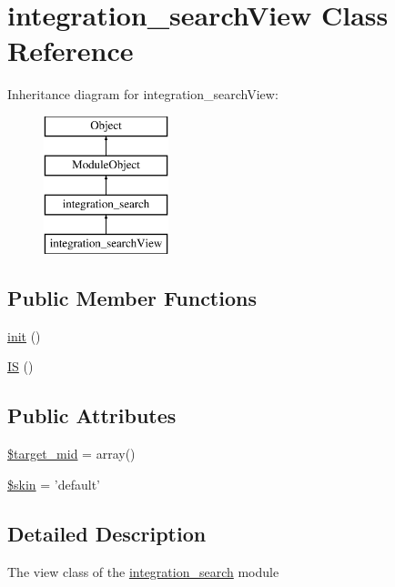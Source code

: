 \hypertarget{classintegration__searchView}{\section{integration\+\_\+search\+View Class Reference}
\label{classintegration__searchView}
}
Inheritance diagram for integration\+\_\+search\+View\+:\begin{figure}[H]
\begin{center}
\leavevmode
\includegraphics[height=4.000000cm]{classintegration__searchView}
\end{center}
\end{figure}
\subsection*{Public Member Functions}
\begin{DoxyCompactItemize}
\item 
\hyperlink{classintegration__searchView_aeed621ea43574fc7b4c5d650d1d698b6}{init} ()
\item 
\hyperlink{classintegration__searchView_a271296176ae955cb88c55c5eac511a23}{I\+S} ()
\end{DoxyCompactItemize}
\subsection*{Public Attributes}
\begin{DoxyCompactItemize}
\item 
\hyperlink{classintegration__searchView_a17efafd7259acddb90e2c181bcfeaa38}{\$target\+\_\+mid} = array()
\item 
\hyperlink{classintegration__searchView_a4281fc0752039ec4025ddaca5771f074}{\$skin} = 'default'
\end{DoxyCompactItemize}


\subsection{Detailed Description}
The view class of the \hyperlink{classintegration__search}{integration\+\_\+search} module

